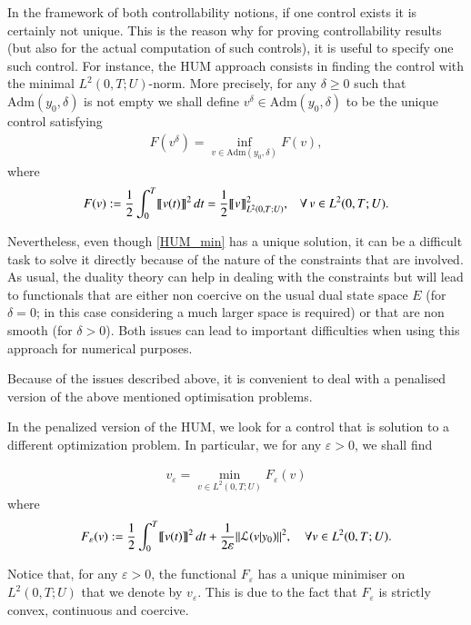 In the framework of both controllability notions, if one control exists it is certainly not unique. This is the reason why for proving controllability results (but also for the actual computation of such controls), it is useful to specify one such control. For instance, the HUM approach consists in finding the control with the minimal $L^2(0,T;U)$-norm. More precisely, for any $\delta\geq 0$ such that $\textrm{Adm}(y_0,\delta)$ is not empty we shall define
$v^{\delta}\in \textrm{Adm}(y_0,\delta)$ to be the unique control satisfying
\begin{align}\label{HUM_min}
	F(v^{\delta}) = \inf_{v\in\textrm{Adm}(y_0,\delta)} F(v),
\end{align}
where 
\begin{align*}
	F(v):= \frac{1}{2}\int_0^T \llbracket v(t)\rrbracket^2\,dt = \frac{1}{2}\llbracket v\rrbracket^2_{L^2(0,T;U)}, \;\;\;\forall\, v\in L^2(0,T;U). 
\end{align*}

Nevertheless, even though \eqref{HUM_min} has a unique solution, it can be a difficult task to solve it directly because of the nature of the constraints that are involved. As usual, the duality theory can help in dealing with the constraints but will lead to functionals that are either non coercive on the usual dual state space $E$ (for $\delta = 0$; in this
case considering a much larger space is required) or that are non smooth (for $\delta > 0$). Both issues can lead to important difficulties when using this approach for numerical purposes.

Because of the issues described above, it is convenient to deal with a penalised version of the above mentioned optimisation problems.

In the penalized version of the HUM, we look for a control that is solution to a different optimization problem. In particular, we for any $\varepsilon>0$, we shall find

\begin{align}\label{min_ve}
	v_\varepsilon=\min_{v\in L^2(0,T;U)} F_\varepsilon (v)
\end{align}
where
\begin{align*}
	F_\varepsilon(v):=\frac{1}{2}\int_0^T\llbracket v(t)\rrbracket^2\,dt+\frac{1}{2\varepsilon}{\left\|\mathcal L(v|y_0)\right\|}_{}^2, \quad \forall v\in L^2(0,T;U).
\end{align*}

Notice that, for any $\varepsilon > 0$, the functional $F_\varepsilon$ has a unique minimiser on $L^2(0,T;U)$  that we denote by $v_\varepsilon$. This is due to the fact that $F_\varepsilon$ is strictly convex, continuous and coercive. 

